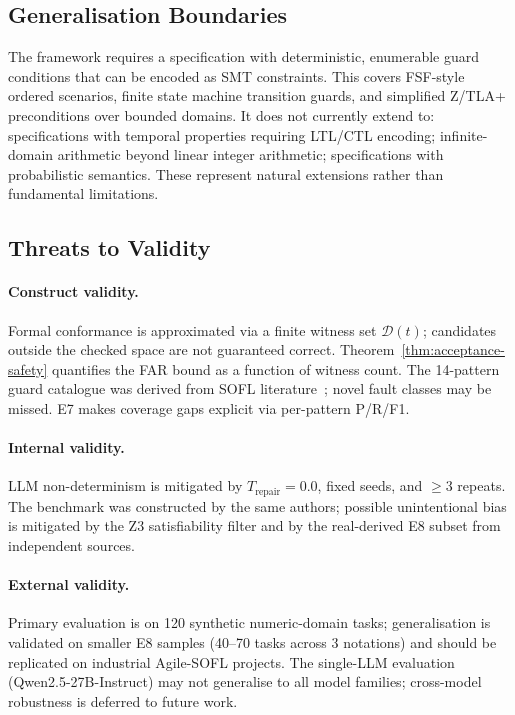 \subsection{Generalisation Boundaries}

The framework requires a specification with deterministic, enumerable guard conditions
that can be encoded as SMT constraints.  This covers FSF-style ordered scenarios, finite
state machine transition guards, and simplified Z/TLA+ preconditions over bounded domains.
It does not currently extend to: specifications with temporal properties requiring LTL/CTL
encoding; infinite-domain arithmetic beyond linear integer arithmetic; specifications
with probabilistic semantics.  These represent natural extensions rather than fundamental
limitations.

\subsection{Threats to Validity}

\paragraph{Construct validity.}
Formal conformance is approximated via a finite witness set $\mathcal{D}(t)$; candidates
outside the checked space are not guaranteed correct.
Theorem~\ref{thm:acceptance-safety} quantifies the FAR bound as a function of witness
count.
The 14-pattern guard catalogue was derived from SOFL literature~\cite{li2023iet_faultprevention}; novel
fault classes may be missed.
E7 makes coverage gaps explicit via per-pattern P/R/F1.

\paragraph{Internal validity.}
LLM non-determinism is mitigated by $T_\text{repair}=0.0$, fixed seeds, and
$\geq 3$ repeats.
The benchmark was constructed by the same authors; possible unintentional bias is
mitigated by the Z3 satisfiability filter and by the real-derived E8 subset from
independent sources.

\paragraph{External validity.}
Primary evaluation is on 120 synthetic numeric-domain tasks; generalisation is validated
on smaller E8 samples (40--70 tasks across 3 notations) and should be replicated on
industrial Agile-SOFL projects.
The single-LLM evaluation (Qwen2.5-27B-Instruct) may not generalise to all model
families; cross-model robustness is deferred to future work.

